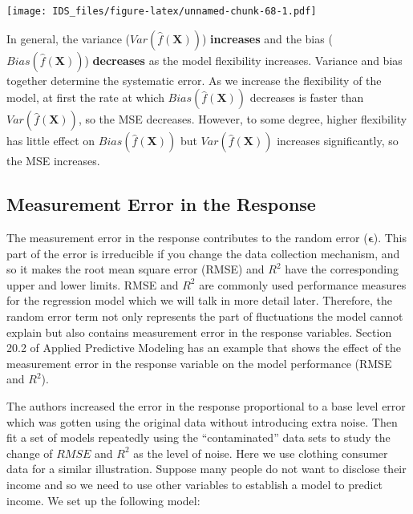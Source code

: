 \documentclass[12pt,]{krantz}
\begin{document}
\texttt{[image: IDS\_files/figure-latex/unnamed-chunk-68-1.pdf]}

In general, the variance (\(Var(\hat{f}(\mathbf{X}))\)) \textbf{increases} and the bias (\(Bias(\hat{f}(\mathbf{X}))\)) \textbf{decreases} as the model flexibility increases. Variance and bias together determine the systematic error. As we increase the flexibility of the model, at first the rate at which \(Bias(\hat{f}(\mathbf{X}))\) decreases is faster than \(Var (\hat{f} (\mathbf{X}))\), so the MSE decreases. However, to some degree, higher flexibility has little effect on \(Bias(\hat{f}(\mathbf{X}))\) but \(Var(\hat{f} (\mathbf{X}))\) increases significantly, so the MSE increases.

\hypertarget{measurement-error-in-the-response}{%
\subsection{Measurement Error in the Response}\label{measurement-error-in-the-response}}

The measurement error in the response contributes to the random error (\(\mathbf{\epsilon}\)). This part of the error is irreducible if you change the data collection mechanism, and so it makes the root mean square error (RMSE) and \(R^2\) have the corresponding upper and lower limits. RMSE and \(R^2\) are commonly used performance measures for the regression model which we will talk in more detail later. Therefore, the random error term not only represents the part of fluctuations the model cannot explain but also contains measurement error in the response variables. Section 20.2 of Applied Predictive Modeling \citep{APM} has an example that shows the effect of the measurement error in the response variable on the model performance (RMSE and \(R^2\)).

The authors increased the error in the response proportional to a base level error which was gotten using the original data without introducing extra noise. Then fit a set of models repeatedly using the ``contaminated'' data sets to study the change of \(RMSE\) and \(R^2\) as the level of noise. Here we use clothing consumer data for a similar illustration. Suppose many people do not want to disclose their income and so we need to use other variables to establish a model to predict income. We set up the following model:
\end{document}
